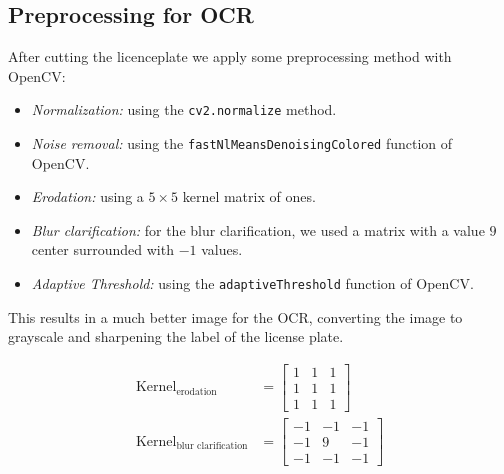 \subsection{Preprocessing for OCR}

After cutting the licenceplate we apply some preprocessing method with OpenCV:
\begin{itemize}
    \item \emph{Normalization:} using the \texttt{cv2.normalize} method.
    \item \emph{Noise removal:} using the
        \texttt{fastNlMeansDenoisingColored} function of OpenCV.
    \item \emph{Erodation:} using a $5 \times 5$ kernel matrix of ones.
    \item \emph{Blur clarification:} for the blur clarification, we used a matrix
        with a value $9$ center surrounded with $-1$ values.
    \item \emph{Adaptive Threshold:} using the \texttt{adaptiveThreshold}
        function of OpenCV. 
\end{itemize}

This results in a much better image for the OCR, converting the image to
grayscale and sharpening the label of the license plate. 

\begin{align*}
    \text{Kernel}_{\text{erodation}}&= 
    \begin{bmatrix}
        1 & 1 & 1\\
        1 & 1 & 1 \\
        1 & 1 & 1
    \end{bmatrix}\\
    \text{Kernel}_{\text{blur clarification}}&= 
    \begin{bmatrix}
        -1 & -1 & -1\\
        -1 & 9  & -1 \\
        -1 & -1 & -1
    \end{bmatrix}
\end{align*}

